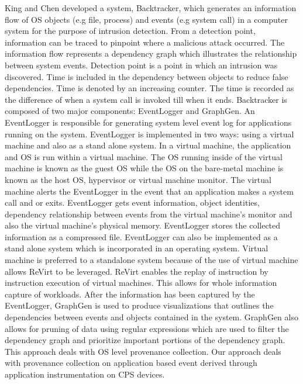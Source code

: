 King and Chen \cite{King:2003:BI:945445.945467} developed a system, Backtracker, which generates an information flow of OS objects (e.g file, process) and events (e.g system call) in a computer system for the purpose of intrusion detection. From a detection point, information can be traced to pinpoint where a malicious attack occurred. The information flow represents a dependency graph which illustrates the relationship between system events. Detection point is a point in which an intrusion was discovered. Time is included in the dependency between objects to reduce false dependencies. Time is denoted by an increasing counter. The time is recorded as the difference of when a system call is invoked till when it ends. Backtracker is composed of two major components: EventLogger and GraphGen. An EventLogger is responsible for generating system level event log for applications running on the system. EventLogger is implemented in two ways: using a virtual machine and also as a stand alone system. In a virtual machine, the application and OS is run within a virtual machine. The OS running inside of the virtual machine is known as the guest OS while the OS on the bare-metal machine is known as the host OS, hypervisor or virtual machine monitor. The virtual machine alerts the EventLogger in the event that an application makes a system call and or exits. EventLogger gets event information, object identities, dependency relationship between events from the virtual machine's monitor and also the virtual machine's physical memory. EventLogger stores the collected information as a compressed file. EventLogger can also be implemented as a stand alone system which is incorporated in an operating system. Virtual machine is preferred to a standalone system because of the use of virtual machine allows ReVirt to be leveraged. ReVirt enables the replay of instruction by instruction execution of virtual machines. This allows for whole information capture of workloads. After the information has been captured by the EventLogger, GraphGen is used to produce visualizations that outlines the dependencies between events and objects contained in the system. GraphGen also allows for pruning of data using regular expressions which are used to filter the dependency graph and prioritize important portions of the dependency graph. This approach deals with OS level provenance collection. Our approach deals with provenance collection on application based event derived through application instrumentation on CPS devices.





